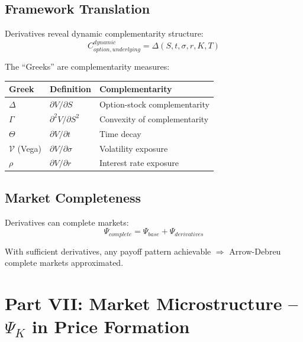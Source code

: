 \subsection{Framework Translation}

Derivatives reveal dynamic complementarity structure:
\begin{equation}
C_{option, underlying}^{dynamic} = \Delta(S, t, \sigma, r, K, T)
\end{equation}

The ``Greeks'' are complementarity measures:
\begin{center}
\renewcommand{\arraystretch}{1.3}
\begin{tabular}{|l|l|l|}
\hline
\textbf{Greek} & \textbf{Definition} & \textbf{Complementarity} \\
\hline
$\Delta$ & $\partial V / \partial S$ & Option-stock complementarity \\
$\Gamma$ & $\partial^2 V / \partial S^2$ & Convexity of complementarity \\
$\Theta$ & $\partial V / \partial t$ & Time decay \\
$\mathcal{V}$ (Vega) & $\partial V / \partial \sigma$ & Volatility exposure \\
$\rho$ & $\partial V / \partial r$ & Interest rate exposure \\
\hline
\end{tabular}
\end{center}

\subsection{Market Completeness}

Derivatives can complete markets:
\begin{equation}
\Psi_{complete} = \Psi_{base} + \Psi_{derivatives}
\end{equation}

With sufficient derivatives, any payoff pattern achievable $\Rightarrow$
Arrow-Debreu complete markets approximated.


\section{Part VII: Market Microstructure -- $\Psi_K$ in Price Formation}
\label{sec:Y-microstructure}

